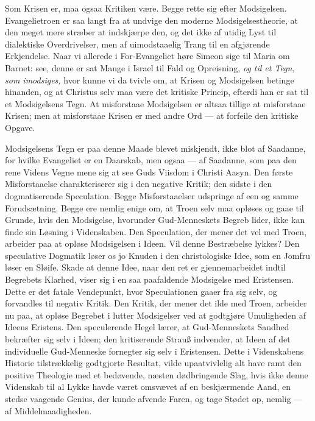 \documentclass[12pt,a4paper]{book}
\begin{document}
Som Krisen er, maa ogsaa Kritiken være. Begge rette sig efter Modsigelsen.
Evangelietroen er saa langt fra at undvige den moderne Modsigelsestheorie, at den meget
mere stræber at indskjærpe den, og det ikke af utidig Lyst til dialektiske
Overdrivelser, men af uimodstaaelig Trang til en afgjørende Erkjendelse. Naar vi
allerede i For-Evangeliet høre Simeon sige til Maria om Barnet: see, denne er sat Mange
i Israel til Fald og Opreisning, \emph{og til et Tegn, som imodsiges,} hvor kunne vi da
tvivle om, at Krisen og Modsigelsen betinge hinanden, og at Christus selv maa være det
kritiske Princip, efterdi han er sat til et Modsigelsens Tegn. At misforstaae
Modsigelsen er altsaa tillige at misforstaae Krisen; men at misforstaae Krisen er med
andre Ord --- at forfeile den kritiske Opgave.

Modsigelsens Tegn er paa denne Maade blevet miskjendt, ikke blot af Saadanne, for hvilke
Evangeliet er en Daarskab, men ogsaa --- af Saadanne, som paa den rene Videns Vegne mene
sig at see Guds Viisdom i Christi Aasyn. Den første Misforstaaelse charakteriserer sig i
den negative Kritik; den sidste i den dogmatiserende Speculation. Begge Misforstaaelser
udspringe af een og samme Forudsætning. Begge ere nemlig enige om, at Troen selv maa
opløses og gaae til Grunde, hvis den Modsigelse, hvorunder Gud-Menneskets Begreb lider,
ikke kan finde sin Løsning i Videnskaben. Den Speculation, der mener det vel med Troen,
arbeider paa at opløse Modsigelsen i Ideen. Vil denne Bestræbelse lykkes? Den
speculative Dogmatik løser os jo Knuden i den christologiske Idee, som en Jomfru løser
en Sløife. Skade at denne Idee, naar den ret er gjennemarbeidet indtil Begrebets
Klarhed, viser sig i en saa paafaldende Modsigelse med Eristensen. Dette er det fatale
Vendepunkt, hvor Speculationen gaaer fra sig selv, og forvandles til negativ Kritik.
Den Kritik, der mener det ilde med Troen, arbeider nu paa, at opløse Begrebet i lutter
Modsigelser ved at godtgjøre Umuligheden af Ideens Eristens. Den speculerende Hegel
lærer, at Gud-Menneskets Sandhed bekræfter sig selv i Ideen; den kritiserende Strauß
indvender, at Ideen af det individuelle Gud-Menneske fornegter sig selv i Eristensen.
Dette i Videnskabens Historie tilstrækkelig godtgjorte Resultat, vilde upaatvivlelig alt
have ramt den positive Theologie med et bedøvende, næsten dødbringende Slag, hvis ikke
denne Videnskab til al Lykke havde været omsvævet af en beskjærmende Aand, en stedse
vaagende Genius, der kunde afvende Faren, og tage Stødet op, nemlig --- af
Middelmaadigheden.
\end{document}
